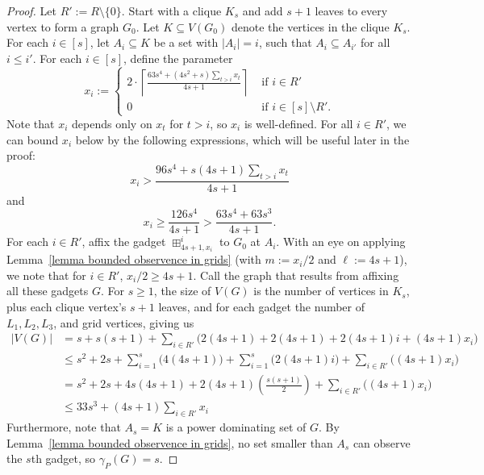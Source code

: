 \documentclass[10pt,a4paper]{amsart}
\begin{document}
        \begin{proof}
            Let $R':=R\setminus \{0\}$.
            Start with a clique $K_s$ and add $s+1$ leaves to every vertex to form a graph $G_0$.
            Let $K\subseteq V(G_0)$ denote the vertices in the clique $K_s$.
            For each $i\in [s]$, let $A_i\subseteq K$ be a set with $|A_i|=i$, such that $A_i\subseteq A_{i'}$ for all $i\leq i'$.
            For each $i\in [s]$, define the parameter
            \[
                x_i:=\begin{cases}
                    2\cdot\left\lceil\displaystyle\frac{63s^4+(4s^2+s) \displaystyle\sum_{t > i}x_{t}}{4s+1}\right\rceil&\text{ if }i\in R'\\
                    0&\text{ if }i\in [s]\setminus R'.
                \end{cases}
            \] 
            Note that $x_i$ depends only on $x_{t}$ for $t > i$, so $x_i$ is well-defined.
            For all $i\in R'$, we can bound $x_i$ below by the following  expressions, which will be useful later in the proof:
            \begin{equation}\label{equation bound on x_i 1}
                x_i>\frac{96s^4+s(4s+1)\displaystyle\sum_{t>i}x_{t}}{4s+1}
            \end{equation} 
            and
            \begin{equation}\label{equation bound on x_i 2}
                x_i\geq \frac{126s^4}{4s+1}>\frac{63s^4+63s^3}{4s+1}.
            \end{equation} 
            For each $i\in R'$, affix the gadget $\boxplus_{4s+1,x_i}^{i}$ to $G_0$ at $A_i$.
            With an eye on applying Lemma~\ref{lemma bounded observence in grids} (with $m:=x_i/2$ and $\ell:=4s+1$), we note that for $i\in R'$, $x_i/2\geq 4s+1$.
            Call the graph that results from affixing all these gadgets $G$.
            For $s \geq 1$, the size of $V(G)$ is the number of vertices in $K_s$, plus each clique vertex's $s+1$ leaves, and for each gadget the number of $L_1, L_2, L_3$, and grid vertices, giving us
            \begin{align}
                |V(G)|&=s+s(s+1)+\sum_{i\in R'} \Big(2(4s+1) + 2(4s+1) + 2(4s+1)i + (4s+1)x_i\Big)\nonumber\\
                &\leq s^2+2s+\sum_{i=1}^{s}\Big(4(4s+1)\Big)+\sum_{i=1}^{s}\Big(2(4s+1)i\Big) + \sum_{i\in R'}\Big((4s+1)x_i\Big)\nonumber\\
                &= s^2+2s+4s(4s+1)+2(4s+1)\left(\frac{s(s+1)}{2}\right) +\sum_{i\in R'}\Big((4s+1)x_i\Big)\nonumber\\
                &\leq 33s^3 + (4s+1)\sum_{i\in R'}x_i\label{equation bound on n}
            \end{align}
            Furthermore, note that $A_s=K$ is a power dominating set of $G$.
            By Lemma~\ref{lemma bounded observence in grids}, no set smaller than $A_s$ can observe the $s$th gadget, so $\gamma_P(G)=s$.
            

\end{proof}
\end{document}
